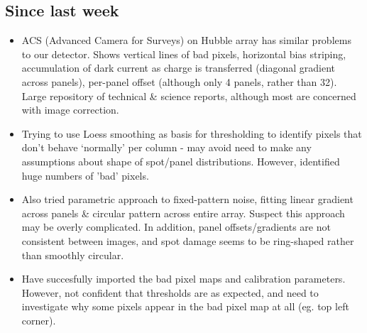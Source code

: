 \documentclass[10pt,fleqn]{article}
\begin{document}
\subsection*{Since last week}

\begin{itemize}

\item ACS (Advanced Camera for Surveys) on Hubble array has similar problems to our detector. Shows vertical lines of bad pixels, horizontal bias striping, accumulation of dark current as charge is transferred (diagonal gradient across panels), per-panel offset (although only 4 panels, rather than 32). Large repository of technical \& science reports, although most are concerned with image correction.

\item Trying to use Loess smoothing as basis for thresholding to identify pixels that don't behave `normally' per column - may avoid need to make any assumptions about shape of spot/panel distributions. However, identified huge numbers of 'bad' pixels.

\item Also tried parametric approach to fixed-pattern noise, fitting linear gradient across panels \& circular pattern across entire array. Suspect this approach may be overly complicated. In addition, panel offsets/gradients are not consistent between images, and spot damage seems to be ring-shaped rather than smoothly circular.

\item Have succesfully imported the bad pixel maps and calibration parameters. However, not confident that thresholds are as expected, and need to investigate why some pixels appear in the bad pixel map at all (eg. top left corner).


\end{itemize}
\end{document}
